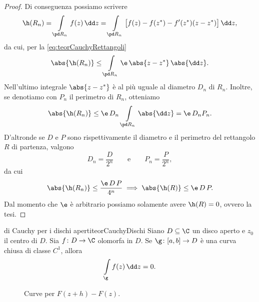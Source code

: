 \begin{proof}
	Di conseguenza possiamo scrivere
	\[
		\h(R_n) = \int\limits_{\pd R_n} f(z)\,\dd z = \int\limits_{\pd R_n} \big[f(z)-f(z^*)-f'(z^*)(z-z^*)\big]\,\dd z,
	\]
	da cui, per la \eqref{eq:teorCauchyRettangoli}
	\[
		\abs{\h(R_n)} \le \int\limits_{\pd R_n} \e\,\abs{z-z^*}\,\abs{\dd z}.
	\]
	Nell'ultimo integrale \(\abs{z-z^*}\) è al più uguale al diametro \(D_n\) di \(R_n\).
	Inoltre, se denotiamo con \(P_n\) il perimetro di \(R_n\), otteniamo
	\[
		\abs{\h(R_n)} \le \e\,D_n\,\int\limits_{\pd R_n} \abs{\dd z} = \e\,D_n P_n.
	\]
	D'altronde se \(D\) e \(P\) sono rispettivamente il diametro e il perimetro del rettangolo \(R\) di partenza, valgono
	\[
		D_n = \frac{D}{2^n} \qquad\text{e}\qquad P_n = \frac{P}{2^n},
	\]
	da cui
	\[
		\abs{\h(R_n)} \le \frac{\e\,D\,P}{4^n} \implies \abs{\h(R)} \le \e\,D\,P.
	\]
	Dal momento che \(\e\) è arbitrario possiamo solamente avere \(\h(R)=0\), ovvero la tesi.
\end{proof}

\begin{teor}{di Cauchy per i dischi aperti}{teorCauchyDischi}
	Siano \(D\subseteq\C\) un disco aperto e \(z_0\) il centro di \(D\).
	Sia \(f\colon D \to \C\) olomorfa in \(D\).
	Se \(\g\colon [a,b] \to D\) è una curva chiusa di classe \(C^1\), allora
	\[
		\int\limits_\g f(z)\,\dd z = 0.
	\]
\end{teor}

\begin{figure}[tp]
	\centering
	
	\caption{Curve per \(F(z+h)-F(z)\).}
	\label{fig:teorCacuhyDisco}
\end{figure}

